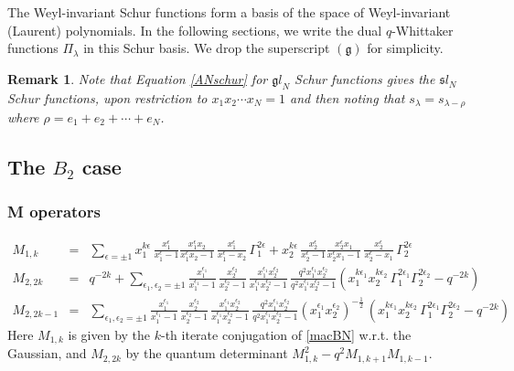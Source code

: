 \documentclass[12pt]{amsart}
\newtheorem{remark}[thm]{Remark}
\numberwithin{equation}{section}
\numberwithin{table}{section}
\begin{document}
\begin{appendix}
The Weyl-invariant Schur functions form a basis of the space of Weyl-invariant (Laurent) polynomials.
In the following sections, we write the dual $q$-Whittaker functions $\Pi_\lambda$ in this Schur basis. We drop the superscript $({\mathfrak g})$ for simplicity.

\begin{remark}
Note that  Equation \eqref{ANschur} for ${\mathfrak gl}_N$ Schur functions
gives the ${\mathfrak sl}_N$ Schur functions, upon restriction to $x_1x_2\cdots x_N=1$ and 
then noting that $s_\lambda=s_{\lambda-\rho}$ where $\rho=e_1+e_2+\cdots +e_N$.
\end{remark}

\subsection{The $B_2$ case}

\subsubsection{M operators}

\begin{eqnarray*}M_{1,k}&=&\sum_{\epsilon=\pm 1}
x_1^{k \epsilon}\, \frac{x_1^\epsilon}{x_1^\epsilon- 1} 
\frac{x_1^\epsilon x_2}{x_1^\epsilon x_2 - 1}\,  \frac{x_1^\epsilon}{x_1^\epsilon - x_2} 
\, \Gamma_1^{2\epsilon}
+x_2^{k \epsilon}\, \frac{x_2^\epsilon}{x_2^\epsilon- 1} 
\frac{x_2^\epsilon x_1}{x_2^\epsilon x_1 - 1}\,  \frac{x_2^\epsilon}{
 x_2^\epsilon - x_1} \, \Gamma_2^{2\epsilon}\\
M_{2,2k}&=&q^{-2k}+\sum_{\epsilon_1,\epsilon_2=\pm 1}
\frac{x_1^{\epsilon_1} }{x_1^{\epsilon_1}-1}\, \frac{x_2^{\epsilon_2} }{x_2^{\epsilon_2}-1}\, \frac{x_1^{\epsilon_1}x_2^{\epsilon_2} }{x_1^{\epsilon_1}x_2^{\epsilon_2}-1}\,
\frac{q^2x_1^{\epsilon_1}x_2^{\epsilon_2} }{q^2x_1^{\epsilon_1}x_2^{\epsilon_2}-1}
(x_1^{k\epsilon_1}x_2^{k\epsilon_2}\,\Gamma_1^{2\epsilon_1}\Gamma_2^{2\epsilon_2}-q^{-2k})\\
M_{2,2k-1}&=&\sum_{\epsilon_1,\epsilon_2=\pm 1}
\frac{x_1^{\epsilon_1} }{x_1^{\epsilon_1}-1}\, \frac{x_2^{\epsilon_2} }{x_2^{\epsilon_2}-1}\, \frac{x_1^{\epsilon_1}x_2^{\epsilon_2} }{x_1^{\epsilon_1}x_2^{\epsilon_2}-1}\,
\frac{q^2x_1^{\epsilon_1}x_2^{\epsilon_2} }{q^2x_1^{\epsilon_1}x_2^{\epsilon_2}-1}
(x_1^{\epsilon_1}x_2^{\epsilon_2})^{-\frac{1}{2}}\, (x_1^{k\epsilon_1}x_2^{k\epsilon_2}\,\Gamma_1^{2\epsilon_1}\Gamma_2^{2\epsilon_2}-q^{-2k})
\end{eqnarray*}
Here $M_{1,k}$ is given by the $k$-th iterate conjugation of \eqref{macBN} w.r.t. the Gaussian, and
$M_{2,2k}$ by the quantum determinant $M_{1,k}^2-q^2M_{1,k+1}M_{1,k-1}$.


\end{appendix}
\end{document}
